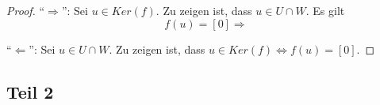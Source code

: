 \documentclass[a4paper,10pt]{article}
\begin{document}
\begin{proof}
 ``$\Rightarrow$'': Sei $u \in Ker(f)$.
 Zu zeigen ist, dass $u \in U \cap W$.
 Es gilt
 \begin{equation}
  f(u) = [0] \Rightarrow 
 \end{equation}

 
 ``$\Leftarrow$'': Sei $u \in U \cap W$.
 Zu zeigen ist, dass $u \in Ker(f) \Leftrightarrow f(u) = [0]$.
 
\end{proof}

\subsection*{Teil 2}
\end{document}
